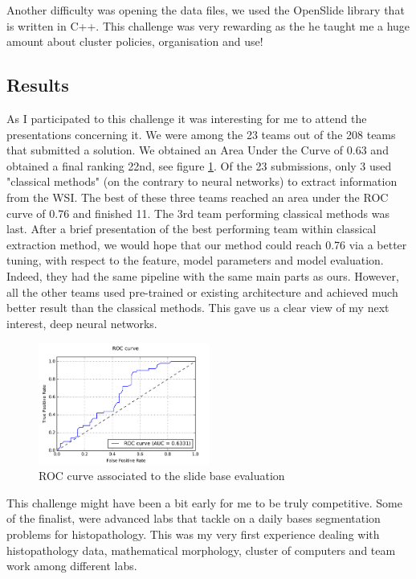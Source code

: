 \documentclass[a4paper,10pt]{article}
\begin{document}
Another difficulty was opening the data files, we used the OpenSlide library that is written in C++.
This challenge was very rewarding as the he taught me a huge amount about cluster policies, organisation and use!


\subsection{Results}

As I participated to this challenge it was interesting for me to
attend the presentations concerning it. We were among the 23 teams out
of the 208 teams that submitted a solution. We obtained an Area Under
the Curve of 0.63 and obtained a final ranking 22nd, see figure
\ref{Eval: ROC}. Of the 23 submissions, only 3 used "classical
methods" (on the contrary to neural networks) to extract information
from the WSI. The best of these three teams reached an area under the
ROC curve of 0.76 and finished 11. The 3rd team performing classical
methods was last. After a brief presentation of the best performing
team within classical extraction method, we would hope that our method
could reach 0.76 via a better tuning, with respect to the feature,
model parameters and model evaluation. Indeed, they had the same
pipeline with the same main parts as ours. However, all the other
teams used pre-trained or existing architecture and achieved much
better result than the classical methods. This gave us a clear view of
my next interest, deep neural networks. 

\begin{figure}[!ht]
\centering
\includegraphics[width=0.5\textwidth]{ROC.png}
\caption{ROC curve associated to the slide base evaluation}
\label{Eval: ROC}
\end{figure}

This challenge might have been a bit early for me to be truly
competitive. Some of the finalist, were advanced labs that tackle on a
daily bases segmentation problems for histopathology. This was my very first experience
dealing with histopathology data, mathematical morphology, cluster of
computers and team work among different labs.  
\end{document}
